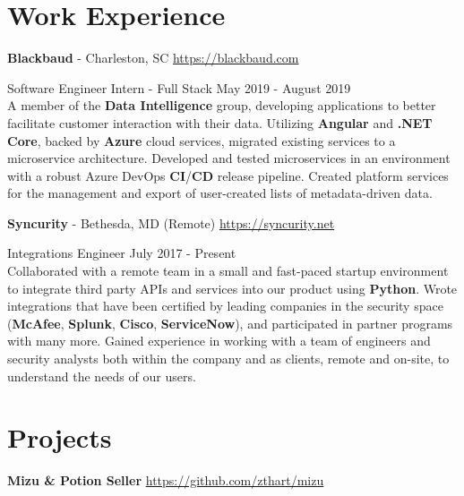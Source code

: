 \documentclass[margin,line]{resume}
\newcommand{\rurl}[1]{\hfill {\footnotesize \url{#1}}}
\begin{document}
\begin{resume}
\section{\mysidestyle Work Experience}
	\begin{asparablank}
	\item{\bf Blackbaud} - Charleston, SC \rurl{https://blackbaud.com}
	\small \item Software Engineer Intern - Full Stack \hfill May 2019 - August 2019 \\

	\small A member of the \textbf{Data Intelligence} group, developing applications to better facilitate customer interaction with their data.
	\small Utilizing \textbf{Angular} and \textbf{.NET Core}, backed by \textbf{Azure} cloud services, migrated existing services to a microservice architecture.
	\small Developed and tested microservices in an environment with a robust Azure DevOps \textbf{CI}/\textbf{CD} release pipeline.
	\small Created platform services for the management and export of user-created lists of metadata-driven data.
	\normalsize
	\\

	\item{\bf Syncurity} - Bethesda, MD (Remote) \rurl{https://syncurity.net}
	\small \item Integrations Engineer \hfill July 2017 - Present \\
         
        \small Collaborated with a remote team in a small and fast-paced startup environment to integrate third party APIs and services into our product using \textbf{Python}.
        \small Wrote integrations that have been certified by leading companies in the security space (\textbf{McAfee}, \textbf{Splunk}, \textbf{Cisco}, \textbf{ServiceNow}), and participated in partner programs with many more.
        \small Gained experience in working with a team of engineers and security analysts both within the company and as clients, remote and on-site, to understand the needs of our users.
	\end{asparablank}

\section{\mysidestyle Projects}
	\begin{asparablank}
        \item {\bf Mizu \& Potion Seller } \rurl{https://github.com/zthart/mizu}


\end{asparablank}
\end{resume}
\end{document}
